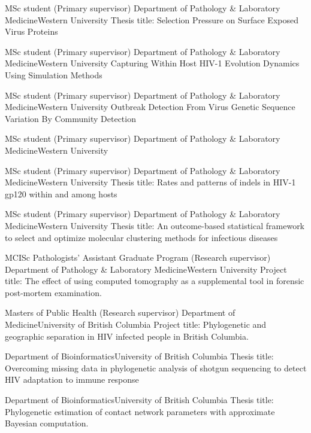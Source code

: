 {MSc student (Primary supervisor)}
{Department of Pathology \& Laboratory Medicine}{Western University}
{Thesis title: Selection Pressure on Surface Exposed Virus Proteins}

{MSc student (Primary supervisor)}
{Department of Pathology \& Laboratory Medicine}{Western University}
{Capturing Within Host HIV-1 Evolution Dynamics Using Simulation Methods}

{MSc student (Primary supervisor)}
{Department of Pathology \& Laboratory Medicine}{Western University}
{Outbreak Detection From Virus Genetic Sequence Variation By Community Detection}

{MSc student (Primary supervisor)}
{Department of Pathology \& Laboratory Medicine}{Western University}
{}

{MSc student (Primary supervisor)}
{Department of Pathology \& Laboratory Medicine}{Western University}
{Thesis title: Rates and patterns of indels in HIV-1 gp120 within and among hosts}

{MSc student (Primary supervisor)}
{Department of Pathology \& Laboratory Medicine}{Western University}
{Thesis title: An outcome-based statistical framework to select and optimize molecular clustering methods for infectious diseases}

{MCISc Pathologists' Assistant Graduate Program (Research supervisor)}
{Department of Pathology \& Laboratory Medicine}{Western University}
{Project title: The effect of using computed tomography as a supplemental tool in forensic post-mortem examination.}

{Masters of Public Health (Research supervisor)}
{Department of Medicine}{University of British Columbia}
{Project title: Phylogenetic and geographic separation in HIV infected people in British Columbia.}

{Department of Bioinformatics}{University of British Columbia}
{Thesis title: Overcoming missing data in phylogenetic analysis of shotgun sequencing to detect HIV adaptation to immune response}

{Department of Bioinformatics}{University of British Columbia}
{Thesis title: Phylogenetic estimation of contact network parameters with approximate Bayesian computation.}


